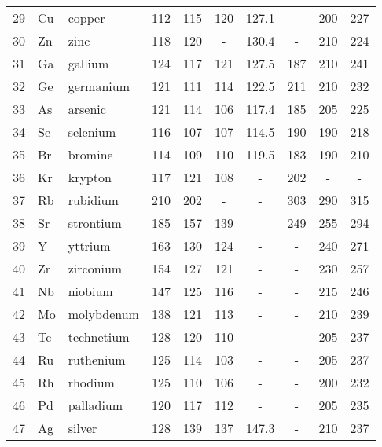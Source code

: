 \documentclass[   %
  final,          %
  a4paper,        %
  8pt
]{extarticle}
\begin{document}
\begin{ThreePartTable}
\begin{longtable}{rll*{7}{S[table-format=3.1, table-space-text-post = , table-align-text-post = false]}}
 29  & Cu   & copper        & 112   & 115   & 120   & 127.1 & {-}          & 200        & 227     \\
 30  & Zn   & zinc          & 118   & 120   & {-}   & 130.4 & {-}          & 210        & 224     \\
 31  & Ga   & gallium       & 124   & 117   & 121   & 127.5 & 187 & 210        & 241     \\
 32  & Ge   & germanium     & 121   & 111   & 114   & 122.5 & 211 & 210        & 232     \\
 33  & As   & arsenic       & 121   & 114   & 106   & 117.4 & 185 & 205        & 225     \\
 34  & Se   & selenium      & 116   & 107   & 107   & 114.5 & 190 & 190        & 218     \\
 35  & Br   & bromine       & 114   & 109   & 110   & 119.5 & 183 & 190        & 210     \\
 36  & Kr   & krypton       & 117   & 121   & 108   & {-}   & 202 & {-}        & {-}     \\
 37  & Rb   & rubidium      & 210   & 202   & {-}   & {-}   & 303 & 290        & 315     \\
 38  & Sr   & strontium     & 185   & 157   & 139   & {-}   & 249 & 255        & 294     \\
 39  & Y    & yttrium       & 163   & 130   & 124   & {-}   & {-}          & 240        & 271     \\
 40  & Zr   & zirconium     & 154   & 127   & 121   & {-}   & {-}          & 230        & 257     \\
 41  & Nb   & niobium       & 147   & 125   & 116   & {-}   & {-}          & 215        & 246     \\
 42  & Mo   & molybdenum    & 138   & 121   & 113   & {-}   & {-}          & 210        & 239     \\
 43  & Tc   & technetium    & 128   & 120   & 110   & {-}   & {-}          & 205        & 237     \\
 44  & Ru   & ruthenium     & 125   & 114   & 103   & {-}   & {-}          & 205        & 237     \\
 45  & Rh   & rhodium       & 125   & 110   & 106   & {-}   & {-}          & 200        & 232     \\
 46  & Pd   & palladium     & 120   & 117   & 112   & {-}   & {-}          & 205        & 235     \\
 47  & Ag   & silver        & 128   & 139   & 137   & 147.3 & {-}          & 210        & 237     \\

\end{longtable}
\end{ThreePartTable}
\end{document}
